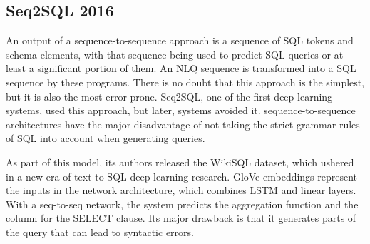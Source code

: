 \subsection{Seq2SQL 2016}

An output of a sequence-to-sequence approach is a sequence of SQL tokens and schema elements, with that sequence being used to predict SQL queries or at least a significant portion of them. An NLQ sequence is transformed into a SQL sequence by these programs. There is no doubt that this approach is the simplest, but it is also the most error-prone. Seq2SQL\cite{zhong_seq2sql_2017}, one of the first deep-learning systems, used this approach, but later, systems avoided it. sequence-to-sequence architectures have the major disadvantage of not taking the strict grammar rules of SQL into account when generating queries.

As part of this model, its authors released the WikiSQL dataset, which ushered in a new era of text-to-SQL deep learning research. GloVe embeddings represent the inputs in the network architecture, which combines LSTM and linear layers. With a seq-to-seq network, the system predicts the aggregation function and the column for the SELECT clause. Its major drawback is that it generates parts of the query that can lead to syntactic errors.